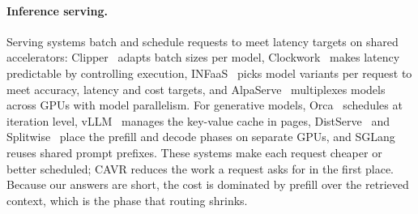 \paragraph{Inference serving.} Serving systems batch and schedule requests to meet latency targets on shared
accelerators: Clipper~\cite{clipper} adapts batch sizes per model, Clockwork~\cite{clockwork} makes latency
predictable by controlling execution, INFaaS~\cite{infaas} picks model variants per request to meet accuracy, latency and
cost targets, and AlpaServe~\cite{alpaserve} multiplexes models across GPUs with model parallelism. For generative
models, Orca~\cite{orca} schedules at iteration level, vLLM~\cite{vllm} manages the key-value cache in pages,
DistServe~\cite{distserve} and Splitwise~\cite{splitwise} place the prefill and decode phases on separate GPUs, and
SGLang~\cite{sglang} reuses shared prompt prefixes. These systems make each request cheaper or better scheduled; CAVR
reduces the work a request asks for in the first place. Because our answers are short, the cost is dominated by
prefill over the retrieved context, which is the phase that routing shrinks.
